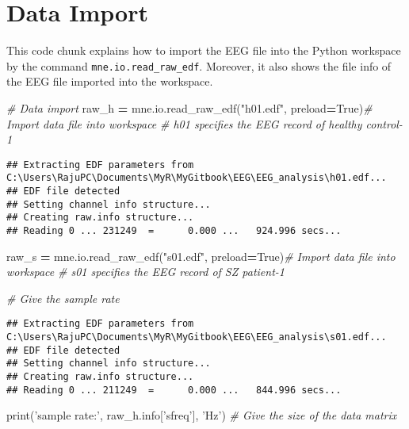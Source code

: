 \documentclass[]{book}
\newenvironment{Shaded}{\begin{snugshade}}{\end{snugshade}}
\newcommand{\BuiltInTok}[1]{#1}
\newcommand{\CommentTok}[1]{\textcolor[rgb]{0.56,0.35,0.01}{\textit{#1}}}
\newcommand{\NormalTok}[1]{#1}
\newcommand{\OperatorTok}[1]{\textcolor[rgb]{0.81,0.36,0.00}{\textbf{#1}}}
\newcommand{\StringTok}[1]{\textcolor[rgb]{0.31,0.60,0.02}{#1}}
\newcommand{\VariableTok}[1]{\textcolor[rgb]{0.00,0.00,0.00}{#1}}
\begin{document}
\hypertarget{data-import}{%
\section{Data Import}\label{data-import}}

This code chunk explains how to import the EEG file into the Python workspace by the command \texttt{mne.io.read\_raw\_edf}. Moreover, it also shows the file info of the EEG file imported into the workspace.

\begin{Shaded}
\begin{Highlighting}[]
\CommentTok{# Data import}
\NormalTok{raw_h }\OperatorTok{=}\NormalTok{ mne.io.read_raw_edf(}\StringTok{"h01.edf"}\NormalTok{, preload}\OperatorTok{=}\VariableTok{True}\NormalTok{)}\CommentTok{# Import data file into workspace}
\CommentTok{# h01 specifies the EEG record of healthy control-1}
\end{Highlighting}
\end{Shaded}

\begin{verbatim}
## Extracting EDF parameters from C:\Users\RajuPC\Documents\MyR\MyGitbook\EEG\EEG_analysis\h01.edf...
## EDF file detected
## Setting channel info structure...
## Creating raw.info structure...
## Reading 0 ... 231249  =      0.000 ...   924.996 secs...
\end{verbatim}

\begin{Shaded}
\begin{Highlighting}[]
\NormalTok{raw_s }\OperatorTok{=}\NormalTok{ mne.io.read_raw_edf(}\StringTok{"s01.edf"}\NormalTok{, preload}\OperatorTok{=}\VariableTok{True}\NormalTok{)}\CommentTok{# Import data file into workspace}
\CommentTok{# s01 specifies the EEG record of SZ patient-1}

\CommentTok{# Give the sample rate}
\end{Highlighting}
\end{Shaded}

\begin{verbatim}
## Extracting EDF parameters from C:\Users\RajuPC\Documents\MyR\MyGitbook\EEG\EEG_analysis\s01.edf...
## EDF file detected
## Setting channel info structure...
## Creating raw.info structure...
## Reading 0 ... 211249  =      0.000 ...   844.996 secs...
\end{verbatim}

\begin{Shaded}
\begin{Highlighting}[]
\BuiltInTok{print}\NormalTok{(}\StringTok{'sample rate:'}\NormalTok{, raw_h.info[}\StringTok{'sfreq'}\NormalTok{], }\StringTok{'Hz'}\NormalTok{)}
\CommentTok{# Give the size of the data matrix}
\end{Highlighting}
\end{Shaded}
\end{document}
